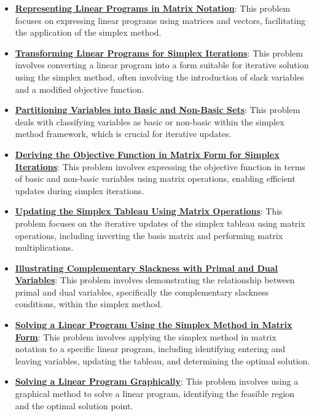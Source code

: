 \documentclass{article}%
\begin{document}
\begin{itemize}[leftmargin=*]%
\item \href{https://www.math.purdue.edu/~yipn/421/2024-09-24-SimplexMatrix.pdf#page=1}{\textbf{Representing Linear Programs in Matrix Notation}}: This problem focuses on expressing linear programs using matrices and vectors, facilitating the application of the simplex method.%
\item \href{https://www.math.purdue.edu/~yipn/421/2024-09-24-SimplexMatrix.pdf#page=2}{\textbf{Transforming Linear Programs for Simplex Iterations}}: This problem involves converting a linear program into a form suitable for iterative solution using the simplex method, often involving the introduction of slack variables and a modified objective function.%
\item \href{https://www.math.purdue.edu/~yipn/421/2024-09-24-SimplexMatrix.pdf#page=4}{\textbf{Partitioning Variables into Basic and Non{-}Basic Sets}}: This problem deals with classifying variables as basic or non-basic within the simplex method framework, which is crucial for iterative updates.%
\item \href{https://www.math.purdue.edu/~yipn/421/2024-09-24-SimplexMatrix.pdf#page=8}{\textbf{Deriving the Objective Function in Matrix Form for Simplex Iterations}}: This problem involves expressing the objective function in terms of basic and non-basic variables using matrix operations, enabling efficient updates during simplex iterations.%
\item \href{https://www.math.purdue.edu/~yipn/421/2024-09-24-SimplexMatrix.pdf#page=10}{\textbf{Updating the Simplex Tableau Using Matrix Operations}}: This problem focuses on the iterative updates of the simplex tableau using matrix operations, including inverting the basis matrix and performing matrix multiplications.%
\item \href{https://www.math.purdue.edu/~yipn/421/2024-09-24-SimplexMatrix.pdf#page=14}{\textbf{Illustrating Complementary Slackness with Primal and Dual Variables}}: This problem involves demonstrating the relationship between primal and dual variables, specifically the complementary slackness conditions, within the simplex method.%
\item \href{https://www.math.purdue.edu/~yipn/421/2024-09-24-SimplexMatrix.pdf#page=15}{\textbf{Solving a Linear Program Using the Simplex Method in Matrix Form}}: This problem involves applying the simplex method in matrix notation to a specific linear program, including identifying entering and leaving variables, updating the tableau, and determining the optimal solution.%
\item \href{https://www.math.purdue.edu/~yipn/421/2024-09-24-SimplexMatrix.pdf#page=16}{\textbf{Solving a Linear Program Graphically}}: This problem involves using a graphical method to solve a linear program, identifying the feasible region and the optimal solution point.%
\end{itemize}%
\end{document}
